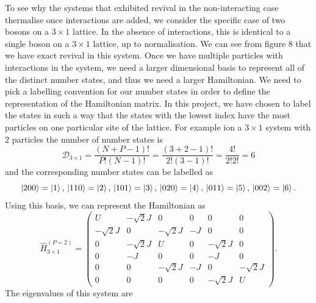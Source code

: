 \documentclass[prb, twocolumn, final]{revtex4-1}
\theoremstyle{plain}
\begin{document}
To see why the systems that exhibited revival in the non-interacting case
thermalise once interactions are added, we consider the specific case of
two bosons on a $3\times1$ lattice. In the absence of interactions, this
is identical to a single boson on a $3\times1$ lattice, up to normalisation.
We can see from figure $8$%
that we have exact revival
in this system. Once we have multiple particles with interactions in the system,
we need a larger dimensional basis to represent all of the distinct number
states, and thus we need a larger Hamiltonian. We need to pick a labelling
convention for our number states in order to define the representation of
the Hamiltonian matrix. In this project, we have chosen to label the states
in such a way that the states with the lowest index have the most particles on
one particular site of the lattice. For example ion a $3 \times 1$ system with
$2$ particles the number of number states is
\begin{equation*}
    \mathcal{D}_{3 \times 1} =
    \frac{(N + P - 1)!}{P! (N-1)!} =
    \frac{(3 + 2 - 1)!}{2! (3-1)!} = \frac{4!}{2! 2!} = 6
\end{equation*}
and the corresponding number states can be labelled as
\begin{equation*}
    \ket{200} = \ket{1},\,
    \ket{110} = \ket{2},\,
    \ket{101} = \ket{3},\,
    \ket{020} = \ket{4},\,
    \ket{011} = \ket{5},\,
    \ket{002} = \ket{6}.
\end{equation*}
Using this basis, we can represent the Hamiltonian as
\begin{equation}
    \hat{H}_{3\times1}^{\left(P=2\right)}
    =
    \begin{pmatrix}
             U & -\sqrt{2}J &          0 &   0 &          0 &          0 \\
    -\sqrt{2}J &          0 & -\sqrt{2}J &  -J &          0 &          0 \\
             0 & -\sqrt{2}J &          U &   0 & -\sqrt{2}J &          0 \\
             0 &         -J &          0 &   0 &         -J &          0 \\
             0 &          0 & -\sqrt{2}J &  -J &          0 & -\sqrt{2}J \\
             0 &          0 &          0 &   0 & -\sqrt{2}J &          U
    \end{pmatrix}.
\end{equation}
The eigenvalues of this system are
\end{document}
